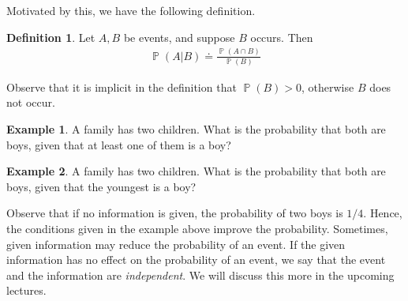 \documentclass[12pt]{article}
\DeclareMathOperator{\prob}{\mathbb{P}}
\theoremstyle{plain}
\theoremstyle{definition}
\newtheorem*{definition}{Definition}
\newtheorem*{example}{Example}
\theoremstyle{remark}
\numberwithin{equation}{section}  %
\begin{document}
Motivated by this, we have the following definition.
\begin{definition}
	Let $A, B$ be events, and suppose $B$ occurs. Then
	\begin{align*}
		\prob(A | B) \doteq \frac{\prob(A \cap B)}{\prob(B)}
	\end{align*}
\end{definition}
Observe that it is implicit in the definition that $\prob(B) > 0$, otherwise
$B$ does not occur.
\begin{example}
	A family has two children. What is the probability that both are boys,
	given that at least one of them is a boy?
\end{example}
\begin{example}
	A family has two children. What is the probability that both are boys,
	given that the youngest is a boy?
\end{example}
Observe that if no information is given, the probability of two boys is $1/4$.
Hence, the conditions given in the example above improve the probability.
Sometimes, given information may reduce the probability of an event.
If the given information has no effect on the probability of an event,
we say that the event and the information are \emph{independent}. We will
discuss this more in the upcoming lectures.
\end{document}
